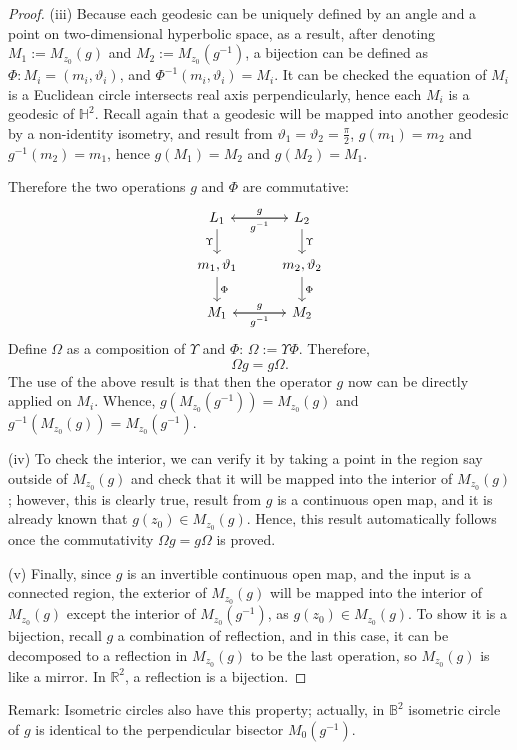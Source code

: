 \documentclass[12pt,oneside]{sfsuthesis}
\theoremstyle{plain} %
\theoremstyle{definition}  %
\theoremstyle{remark}  %
\theoremstyle{plain}
\begin{document}
{\begin{proof}
(iii) Because each geodesic can be uniquely defined by an angle and a point on two-dimensional hyperbolic space, as a result, after denoting $M_1:=M_{z_0}(g)$ and $M_2:=M_{z_0}(g^{-1})$, a bijection can be defined as $\Phi:M_i=(m_i,\vartheta_i)$, and $\Phi^{-1}(m_i,\vartheta_i)=M_i$. It can be checked the equation of $M_i$ is a Euclidean circle intersects real axis perpendicularly, hence each $M_i$ is a geodesic of $\mathbb{H}^2$. Recall again that a geodesic will be mapped into another geodesic by a non-identity isometry, and result from $\vartheta_1=\vartheta_2=\frac{\pi}{2}$, $g(m_1)=m_2$ and $g^{-1}(m_2)=m_1$, hence $g(M_1)=M_2$ and $g(M_2)=M_1$.

Therefore the two operations $g$ and $\Phi$ are commutative:
\[ \begin{tikzcd}
L_1 \arrow{r}{g} \arrow[swap]{d}{\Upsilon} &\arrow{l}{g^{-1}} L_2 \arrow{d}{\Upsilon} \\%
m_1,\vartheta_1\arrow{d}{\Phi} & m_2,\vartheta_2\arrow{d}{\Phi}
\\%
M_1 \arrow{r}{g}& \arrow{l}{g^{-1}} M_2
\end{tikzcd}
\]
Define $\Omega$ as a composition of $\Upsilon$ and $\Phi$: $\Omega:=\Upsilon\Phi$. Therefore, $$ \Omega g = g \Omega.$$ The use of the above result is that then the operator $g$ now can be directly applied on $M_i$. Whence, $g(M_{z_0}(g^{-1}))=M_{z_0}(g)$ and $g^{-1}(M_{z_0}(g))=M_{z_0}(g^{-1}).$

(iv) To check the interior, we can verify it by taking a point in the region say outside of $M_{z_0}(g)$ and check that it will be mapped into the interior of $M_{z_0}(g)$; however, this is clearly true, result from $g$ is a continuous open map, and it is already known that $g(z_0)\in M_{z_0}(g)$. Hence, this result automatically follows once the commutativity $\Omega g = g \Omega$ is proved.

(v) Finally, since $g$ is an invertible continuous open map, and the input is a connected region, the exterior of $M_{z_0}(g)$ will be mapped into the interior of $M_{z_0}(g)$ except the interior of $M_{z_0}(g^{-1})$, as $g(z_0)\in M_{z_0}(g)$. To show it is a bijection, recall $g$ a combination of reflection, and in this case, it can be decomposed to a reflection in $M_{z_0}(g)$ to be the last operation, so $M_{z_0}(g)$ is like a mirror. In $\mathbb{R}^2$, a reflection is a bijection. 
\end{proof}

Remark: Isometric circles also have this property; actually, in $\mathbb{B}^2$ isometric circle of $g$ is identical to the perpendicular bisector $M_{0}(g^{-1})$.

}
\end{document}
